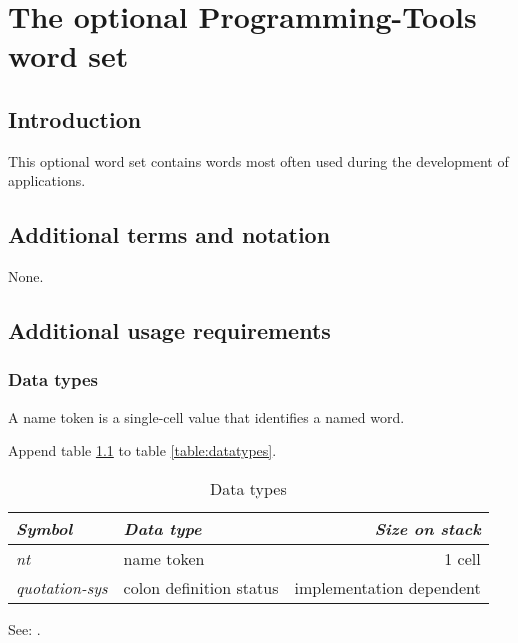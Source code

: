 
\chapter{The optional Programming-Tools word set} %

\section{Introduction} %

This optional word set contains words most often used during the
development of applications.

\section{Additional terms and notation} %

None.

\section{Additional usage requirements} %

\subsection{Data types} %
\label{tools:datatype}

A name token is a single-cell value that identifies a named word.

Append table \ref{tools:types} to table \ref{table:datatypes}.

\begin{table}[h]
  \begin{center}
	\caption{Data types}
	\label{tools:types}
	\begin{tabular}{llr}
	\hline\hline
	\emph{Symbol} & \emph{Data type} & \emph{Size on stack} \\
	\hline
	\emph{nt}				& name token				& 1 cell \\
	\emph{quotation-sys}	& colon definition status	& implementation dependent \\
	\hline\hline
	\end{tabular}
  \end{center}
\end{table}


See: .

